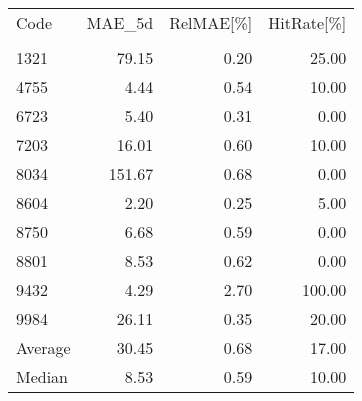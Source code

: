 \begingroup
\footnotesize
\begin{tabular}{lrrr}
\hline
Code & MAE\_5d & RelMAE[\%] & HitRate[\%] \\\\
\hline
1321 & 79.15 & 0.20 & 25.00 \\
4755 & 4.44 & 0.54 & 10.00 \\
6723 & 5.40 & 0.31 & 0.00 \\
7203 & 16.01 & 0.60 & 10.00 \\
8034 & 151.67 & 0.68 & 0.00 \\
8604 & 2.20 & 0.25 & 5.00 \\
8750 & 6.68 & 0.59 & 0.00 \\
8801 & 8.53 & 0.62 & 0.00 \\
9432 & 4.29 & 2.70 & 100.00 \\
9984 & 26.11 & 0.35 & 20.00 \\
Average & 30.45 & 0.68 & 17.00 \\
Median & 8.53 & 0.59 & 10.00 \\
\hline
\end{tabular}
\endgroup
